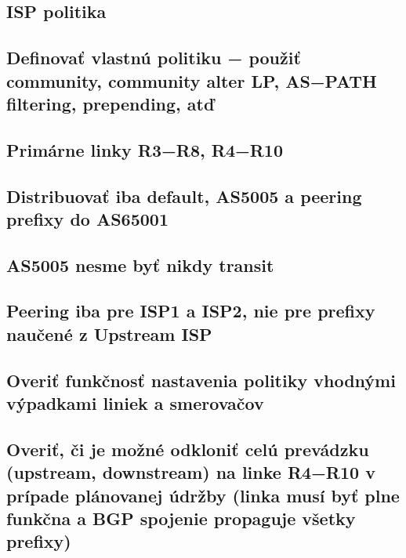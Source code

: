 \documentclass[12pt,twoside,a4paper]{report}
\begin{document}
\subsection{ISP politika}
\subsection{Definovať vlastnú politiku − použiť community, community alter LP, AS−PATH filtering, prepending, atď}
\subsection{Primárne linky R3−R8, R4−R10}
\subsection{Distribuovať iba default, AS5005 a peering prefixy do AS65001}
\subsection{AS5005 nesme byť nikdy transit}
\subsection{Peering iba pre ISP1 a ISP2, nie pre prefixy naučené z Upstream ISP}
\subsection{Overiť funkčnosť nastavenia politiky vhodnými výpadkami liniek a smerovačov}
\subsection{Overiť, či je možné odkloniť celú prevádzku (upstream, downstream) na linke R4−R10 v prípade plánovanej údržby (linka musí byť plne funkčna a BGP spojenie propaguje všetky prefixy)}
\end{document}
